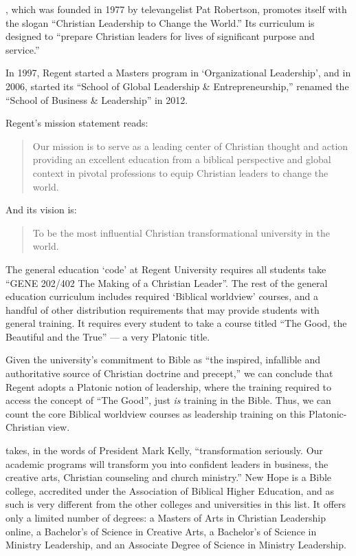 , which was founded in 1977 by televangelist Pat Robertson, promotes itself with the slogan ``Christian Leadership to Change the World.'' Its curriculum is designed to ``prepare Christian leaders for lives of significant purpose and service.'' 

In 1997, Regent started a Masters program in `Organizational Leadership', and in 2006, started its ``School of Global Leadership \& Entrepreneurship,'' renamed the ``School of Business \& Leadership'' in 2012.

Regent's mission statement reads:

\begin{quote}

Our mission is to serve as a leading center of Christian thought and action providing an excellent education from a biblical perspective and global context in pivotal professions to equip Christian leaders to change the world.
\end{quote}

And its vision is:

\begin{quote}

To be the most influential Christian transformational university in the world.
\end{quote}

The general education `code' at Regent University requires all students take ``GENE 202\slash 402 The Making of a Christian Leader''. The rest of the general education curriculum includes required `Biblical worldview' courses, and a handful of other distribution requirements that may provide students with general training. It requires every student to take a course titled ``The Good, the Beautiful and the True'' --- a very Platonic title.

Given the university's commitment to Bible as ``the inspired, infallible and authoritative source of Christian doctrine and precept,'' we can conclude that Regent adopts a Platonic notion of leadership, where the training required to access the concept of ``The Good'', just \emph{is} training in the Bible. Thus, we can count the core Biblical worldview courses as leadership training on this Platonic-Christian view.

 takes, in the words of President Mark Kelly, ``transformation seriously. Our academic programs will transform you into confident leaders in business, the creative arts, Christian counseling and church ministry.'' New Hope is a Bible college, accredited under the Association of Biblical Higher Education, and as such is very different from the other colleges and universities in this list. It offers only a limited number of degrees: a Masters of Arts in Christian Leadership online, a Bachelor's of Science in Creative Arts, a Bachelor's of Science in Ministry Leadership, and an Associate Degree of Science in Ministry Leadership.


